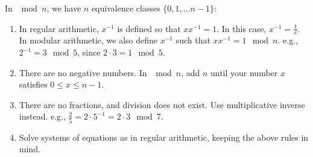 
In $\mod n$, we have $n$ equivalence classes $\{0, 1, \dots n-1\}$:

\begin{enumerate}
\item In regular arithmetic, $x^{-1}$ is defined so that $x x^{-1} = 1$. In this
case, $x^{-1} = \frac{1}{x}$. In modular arithmetic, we also define $x^{-1}$
such that $x x^{-1} = 1 \mod n$. e.g., $2^{-1} = 3 \mod 5$, since $2 \cdot 3 = 1 \mod 5$.
\item There are no negative numbers. In $\mod n$, add $n$ until your number $x$
satisfies $0 \leq x \leq n-1$.
\item There are no fractions, and division does not exist. Use multiplicative
inverse instead. e.g., $\frac{2}{5} = 2 \cdot 5^{-1} = 2 \cdot 3 \mod 7$.
\item Solve systems of equations as in regular arithmetic, keeping the above
rules in mind.
\end{enumerate}